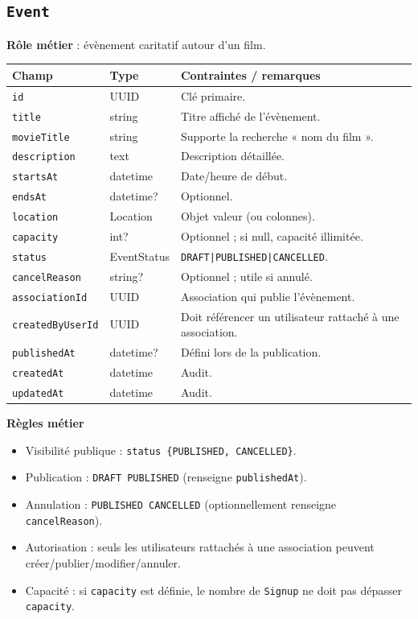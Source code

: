 \documentclass[11pt,a4paper]{article}
\begin{document}
\subsection{\texttt{Event}}
\textbf{Rôle métier} : évènement caritatif autour d’un film.

\begin{longtable}{@{}p{}p{}p{}@{}}
\toprule
\textbf{Champ} & \textbf{Type} & \textbf{Contraintes / remarques}\\
\midrule
\endhead
\texttt{id} & UUID & Clé primaire.\\
\texttt{title} & string & Titre affiché de l’évènement.\\
\texttt{movieTitle} & string & Supporte la recherche « nom du film ».\\
\texttt{description} & text & Description détaillée.\\
\texttt{startsAt} & datetime & Date/heure de début.\\
\texttt{endsAt} & datetime? & Optionnel.\\
\texttt{location} & Location & Objet valeur (ou colonnes).\\
\texttt{capacity} & int? & Optionnel ; si null, capacité illimitée.\\
\texttt{status} & EventStatus & \texttt{DRAFT|PUBLISHED|CANCELLED}.\\
\texttt{cancelReason} & string? & Optionnel ; utile si annulé.\\
\texttt{associationId} & UUID & Association qui publie l’évènement.\\
\texttt{createdByUserId} & UUID & Doit référencer un utilisateur rattaché à une association.\\
\texttt{publishedAt} & datetime? & Défini lors de la publication.\\
\texttt{createdAt} & datetime & Audit.\\
\texttt{updatedAt} & datetime & Audit.\\
\bottomrule
\end{longtable}

\textbf{Règles métier}
\begin{itemize}
  \item Visibilité publique : \texttt{status \in \{PUBLISHED, CANCELLED\}}.
  \item Publication : \texttt{DRAFT \to PUBLISHED} (renseigne \texttt{publishedAt}).
  \item Annulation : \texttt{PUBLISHED \to CANCELLED} (optionnellement renseigne \texttt{cancelReason}).
  \item Autorisation : seuls les utilisateurs rattachés à une association peuvent créer/publier/modifier/annuler.
  \item Capacité : si \texttt{capacity} est définie, le nombre de \texttt{Signup} ne doit pas dépasser \texttt{capacity}.
\end{itemize}
\end{document}
